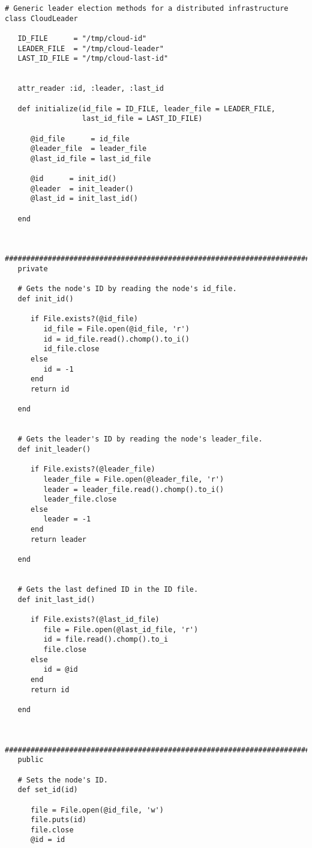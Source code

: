 \begin{lstlisting}
# Generic leader election methods for a distributed infrastructure
class CloudLeader
   
   ID_FILE      = "/tmp/cloud-id"
   LEADER_FILE  = "/tmp/cloud-leader"
   LAST_ID_FILE = "/tmp/cloud-last-id"
   
   
   attr_reader :id, :leader, :last_id
   
   def initialize(id_file = ID_FILE, leader_file = LEADER_FILE,
                  last_id_file = LAST_ID_FILE)
   
      @id_file      = id_file
      @leader_file  = leader_file
      @last_id_file = last_id_file 
      
      @id      = init_id()
      @leader  = init_leader()
      @last_id = init_last_id()
      
   end
   
   
   #############################################################################
   private
   
   # Gets the node's ID by reading the node's id_file.
   def init_id()
      
      if File.exists?(@id_file)
         id_file = File.open(@id_file, 'r')
         id = id_file.read().chomp().to_i()
         id_file.close
      else
         id = -1
      end
      return id
   
   end
   
   
   # Gets the leader's ID by reading the node's leader_file.
   def init_leader()
   
      if File.exists?(@leader_file)
         leader_file = File.open(@leader_file, 'r')
         leader = leader_file.read().chomp().to_i()
         leader_file.close
      else
         leader = -1
      end
      return leader
   
   end
   
   
   # Gets the last defined ID in the ID file.
   def init_last_id()

      if File.exists?(@last_id_file)
         file = File.open(@last_id_file, 'r')
         id = file.read().chomp().to_i
         file.close
      else
         id = @id
      end
      return id

   end
   
   
   #############################################################################
   public
   
   # Sets the node's ID.
   def set_id(id)
   
      file = File.open(@id_file, 'w')
      file.puts(id)
      file.close
      @id = id
      

\end{lstlisting}
